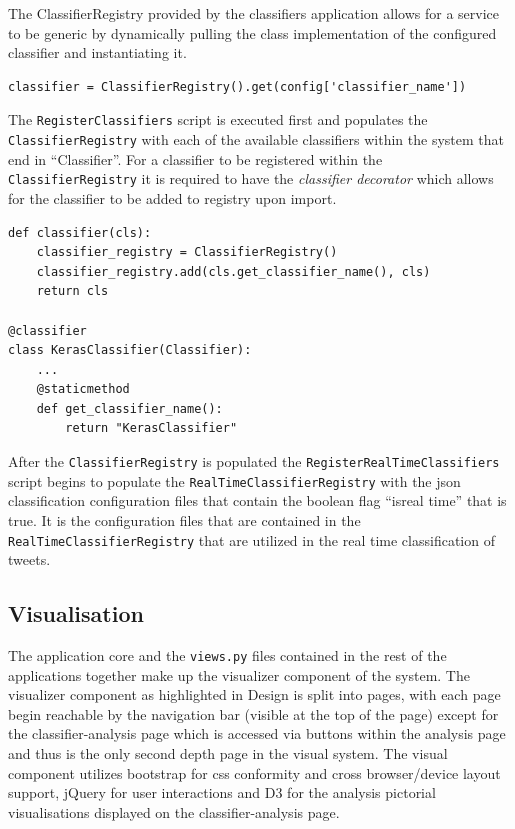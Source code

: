\documentclass[11pt]{report}
\begin{document}
The ClassifierRegistry provided by the classifiers application allows for a service to be generic by dynamically pulling the class implementation of the configured classifier and instantiating it. 

\begin{center}
\begin{lstlisting}
classifier = ClassifierRegistry().get(config['classifier_name'])
\end{lstlisting}
\end{center}

The \texttt{RegisterClassifiers} script is executed first and populates the \texttt{ClassifierRegistry} with each of the available classifiers within the system that end in ``Classifier''. For a classifier to be registered within the \texttt{ClassifierRegistry} it is required to have the \textit{classifier decorator} which allows for the classifier to be added to registry upon import.

\begin{center}
\begin{lstlisting}
def classifier(cls):
    classifier_registry = ClassifierRegistry()
    classifier_registry.add(cls.get_classifier_name(), cls)
    return cls
    
@classifier
class KerasClassifier(Classifier):
    ...
    @staticmethod
    def get_classifier_name():
        return "KerasClassifier"

\end{lstlisting}
\end{center}

After the \texttt{ClassifierRegistry} is populated the \texttt{RegisterRealTimeClassifiers} script begins to populate the \texttt{RealTimeClassifierRegistry} with the json classification configuration files that contain the boolean flag ``is\textunderscore real \textunderscore time'' that is true. It is the configuration files that are contained in the \texttt{RealTimeClassifierRegistry} that are utilized in the real time classification of tweets.

\subsection*{Visualisation}
The application core and the \texttt{views.py} files contained in the rest of the applications together make up the visualizer component of the system. The visualizer component as highlighted in Design is split into pages, with each page begin reachable by the navigation bar (visible at the top of the page) except for the classifier-analysis page which is accessed via buttons within the analysis page and thus is the only second depth page in the visual system. The visual component utilizes bootstrap for css conformity and cross browser/device layout support, jQuery for user interactions and D3 for the analysis pictorial visualisations displayed on the classifier-analysis page. 
\end{document}
